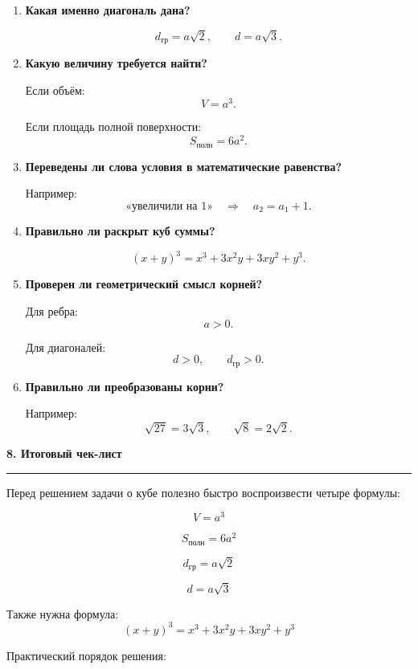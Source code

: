 \documentclass[a4paper,12pt]{article}
\newcommand{\sectiontitle}[1]{%
    \vspace{0.6em}
    {\Large\bfseries\color{darkaccent}#1}\par
    \vspace{0.25em}
    {\color{accent}\rule{\linewidth}{0.7pt}}
    \vspace{0.45em}
}
\begin{document}
\begin{enumerate}

\item
\textbf{Какая именно диагональ дана?}

\[
d_{\text{гр}}=a\sqrt2,
\qquad
d=a\sqrt3.
\]

\item
\textbf{Какую величину требуется найти?}

Если объём:
\[
V=a^3.
\]

Если площадь полной поверхности:
\[
S_{\text{полн}}=6a^2.
\]

\item
\textbf{Переведены ли слова условия в математические равенства?}

Например:
\[
\text{«увеличили на }1\text{»}
\quad\Longrightarrow\quad
a_2=a_1+1.
\]

\item
\textbf{Правильно ли раскрыт куб суммы?}

\[
(x+y)^3
=
x^3+3x^2y+3xy^2+y^3.
\]

\item
\textbf{Проверен ли геометрический смысл корней?}

Для ребра:
\[
a>0.
\]

Для диагоналей:
\[
d>0,
\qquad
d_{\text{гр}}>0.
\]

\item
\textbf{Правильно ли преобразованы корни?}

Например:
\[
\sqrt{27}=3\sqrt3,
\qquad
\sqrt8=2\sqrt2.
\]

\end{enumerate}

\sectiontitle{8. Итоговый чек-лист}

Перед решением задачи о кубе полезно быстро воспроизвести четыре формулы:

\[
\boxed{V=a^3}
\]

\[
\boxed{S_{\text{полн}}=6a^2}
\]

\[
\boxed{d_{\text{гр}}=a\sqrt2}
\]

\[
\boxed{d=a\sqrt3}
\]

Также нужна формула:
\[
\boxed{
(x+y)^3
=
x^3+3x^2y+3xy^2+y^3
}
\]

Практический порядок решения:
\end{document}
